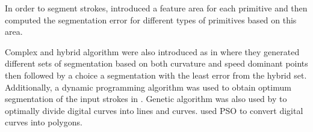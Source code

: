 \documentclass[a4paper,10pt]{IEEEconf}
\begin{document}
In order to segment strokes, \cite{meanshift10} introduced a feature area for each primitive and then computed the segmentation error for different types of primitives based on this area. %

Complex and hybrid algorithm were also introduced as in  \cite{earlyprocess} where they generated different sets of segmentation based on both curvature and speed dominant points then followed by a choice a segmentation with the least error from the hybrid set. Additionally, a dynamic programming algorithm was used to obtain optimum segmentation of the input strokes in \cite{GeometryAndDomain102}. Genetic algorithm was also used by \cite{CruveDivisionSwarm} to optimally divide digital curves into lines and curves. \citeauthor{PolygonApproximationPSO} used PSO to convert digital curves into polygons\cite{PolygonApproximationPSO}.
\end{document}
